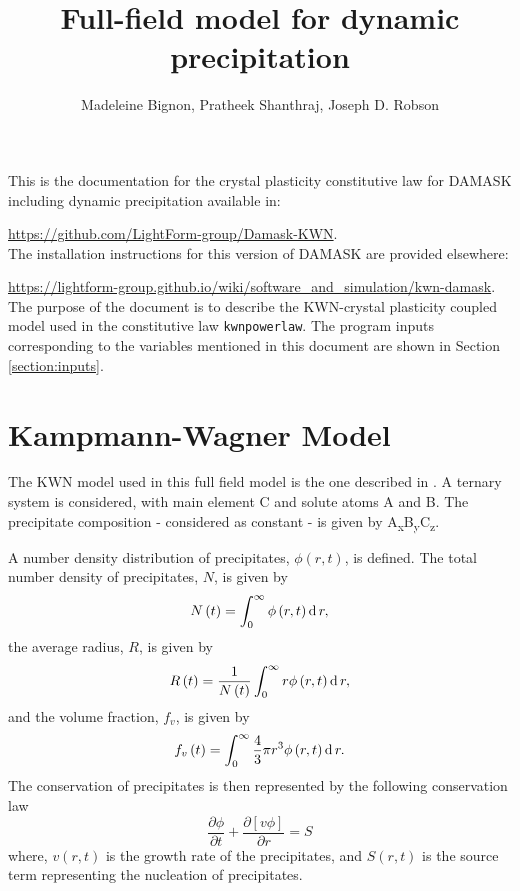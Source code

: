 \documentclass[11pt]{scrartcl}
\newcommand{\inc}[1]{\ensuremath{\text d\,{#1}}}
\newcommand{\partialder}[2]{\ensuremath{\frac{\partial{#1}}{\partial{#2}}}}
\begin{document}
\author{Madeleine Bignon, Pratheek Shanthraj, Joseph D. Robson}
\title{Full-field model for dynamic precipitation}
\maketitle

\noindent This is the documentation for the crystal plasticity constitutive law for DAMASK including dynamic precipitation available in:
 
\noindent  \url{https://github.com/LightForm-group/Damask-KWN}.  \\
 
\noindent The installation instructions for this version of DAMASK are provided elsewhere:
 
  \noindent  \url{https://lightform-group.github.io/wiki/software_and_simulation/kwn-damask}.\\


\noindent The purpose of the document is to describe the KWN-crystal plasticity coupled model used in the constitutive law \texttt{kwnpowerlaw}.  The program inputs corresponding to the variables mentioned in this document are shown in Section \ref{section:inputs}.

\section{Kampmann-Wagner Model}

The KWN model used in this full field model is the one described in \cite{Bignon2022}. A ternary system is considered, with main element C and solute atoms A and B. The precipitate composition - considered as constant - is given by \hypertarget{stoichiometry} {A\textsubscript{x}B\textsubscript{y}C\textsubscript{z}}.

A number density distribution of precipitates, $\phi\left(r,t\right)$, is defined. 
The total number density of precipitates, $N$, is given by
%
\begin{equation}
\label{eq: totaldensity}
N\left(t\right) = \int_{0}^{\infty} \phi\left(r,t\right) \inc{r},
\end{equation}
%
the average radius, $R$, is given by
%
\begin{equation}
\label{eq: avgradius}
R\left(t\right) = \frac{1}{N\left(t\right)}\int_{0}^{\infty} r \phi\left(r,t\right) \inc{r},
\end{equation}
%
and the volume fraction, $f_{v}$, is given by
%
\begin{equation}
\label{eq: volfrac}
f_{v}\left(t\right) =\int_{0}^{\infty} \frac{4}{3} \pi r^3 \phi\left(r,t\right) \inc{r}.
\end{equation}
%
The conservation of precipitates is then represented by the following conservation law
%
\begin{equation}
\label{eq: conservation}
\partialder{\phi}{t}+ \partialder{\left[v \phi\right]}{r} = S
\end{equation}
%
where, $v\left(r,t\right)$ is the growth rate of the precipitates, and $S\left(r,t\right)$ is the source term representing the nucleation of precipitates.
\end{document}
